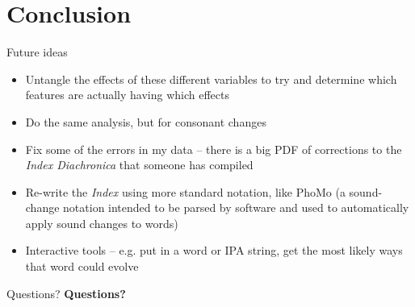 \documentclass[10pt]{beamer}
\begin{document}
  \section*{Conclusion}
  \begin{frame}{Future ideas}
    \begin{itemize}
      \item Untangle the effects of these different variables to try and determine which features are actually having which effects
      \item Do the same analysis, but for consonant changes
      \item Fix some of the errors in my data -- there is a big PDF of corrections to the \textit{Index Diachronica} that someone has compiled
      \item Re-write the \textit{Index} using more standard notation, like PhoMo (a sound-change notation intended to be parsed by software and used to automatically apply sound changes to words)
      \item Interactive tools -- e.g. put in a word or IPA string, get the most likely ways that word could evolve
    \end{itemize}
  \end{frame}
  \begin{frame}{Questions?}
    \centering
    \Large \textbf{Questions?}
  \end{frame}
\end{document}
